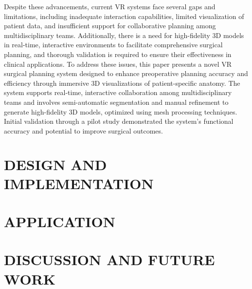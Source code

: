 \documentclass[manuscript]{acmart} %
\begin{document}
Despite these advancements, current VR systems face several gaps and limitations, including inadequate interaction capabilities, limited visualization of patient data, and insufficient support for collaborative planning among multidisciplinary teams. Additionally, there is a need for high-fidelity 3D models in real-time, interactive environments to facilitate comprehensive surgical planning, and thorough validation is required to ensure their effectiveness in clinical applications. To address these issues, this paper presents a novel VR surgical planning system designed to enhance preoperative planning accuracy and efficiency through immersive 3D visualizations of patient-specific anatomy. The system supports real-time, interactive collaboration among multidisciplinary teams and involves semi-automatic segmentation and manual refinement to generate high-fidelity 3D models, optimized using mesh processing techniques. Initial validation through a pilot study demonstrated the system’s functional accuracy and potential to improve surgical outcomes.


\section{DESIGN AND IMPLEMENTATION}


\section{APPLICATION}


\section{DISCUSSION AND FUTURE WORK}





\appendix
\end{document}
